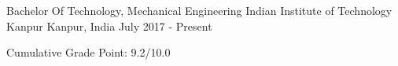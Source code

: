 
\begin{cventries}

  \cventry
    {Bachelor Of Technology, Mechanical Engineering}
    {Indian Institute of Technology Kanpur}
    {Kanpur, India}
    {July 2017 - Present}
    {
      \begin{cvitems}
        \item {Cumulative Grade Point: 9.2/10.0}
      \end{cvitems}
    }
  
\end{cventries}

